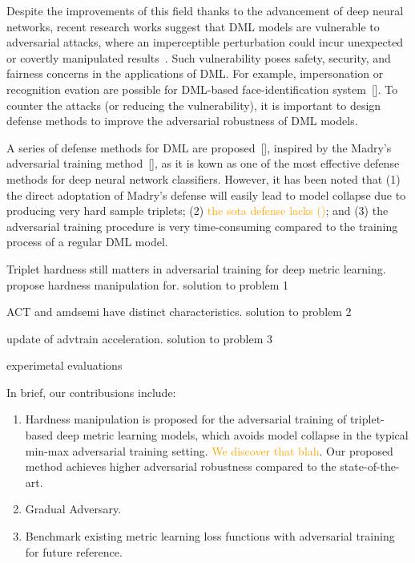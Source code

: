 \documentclass[10pt,twocolumn,letterpaper]{article}
\newcommand{\oo}[1]{\textcolor{orange}{#1}}
\begin{document}

Despite the improvements of this field thanks to the advancement of deep neural
networks, recent research works suggest that DML models are vulnerable to
adversarial attacks, where an imperceptible perturbation could incur unexpected
or covertly manipulated results~\cite{advrank}.
%
Such vulnerability poses safety, security, and fairness concerns in the
applications of DML.
%
For example, impersonation or recognition evation are possible for DML-based
face-identification system~[].
%
To counter the attacks (or reducing the vulnerability), it is important to
design defense methods to improve the adversarial robustness of DML models.

A series of defense methods for DML are proposed~[], inspired by the Madry's
adversarial training method~[], as it is kown as one of the most effective
defense methods for deep neural network classifiers.
%
However, it has been noted that
%
(1) the direct adoptation of Madry's defense will easily lead to model collapse
due to producing very hard sample triplets;
%
(2) \oo{the sota defense lacks ()};
%
and (3) the adversarial training procedure is very time-consuming compared
to the training process of a regular DML model.

Triplet hardness still matters in adversarial training for deep metric
learning.
%
propose hardness manipulation for.
solution to problem 1

ACT and amdsemi have distinct characteristics.
solution to problem 2

update of advtrain acceleration.
solution to problem 3

experimetal evaluations

In brief, our contribusions include:
%
\begin{enumerate}
	\item Hardness manipulation is proposed for the adversarial training
		of triplet-based deep metric learning models, which avoids model
		collapse in the typical min-max adversarial training setting.
		\oo{We discover that blah}.
		Our proposed method achieves higher adversarial robustness compared
		to the state-of-the-art.
	\item Gradual Adversary.
	\item Benchmark existing metric learning loss functions with adversarial
		training for future reference.
\end{enumerate}
\end{document}

